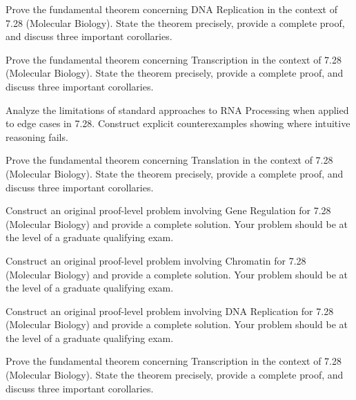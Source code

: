\documentclass[12pt,a4paper]{exam}
\begin{document}
\begin{questions}

\question[2]
Prove the fundamental theorem concerning DNA Replication in the context of 7.28 (Molecular Biology). State the theorem precisely, provide a complete proof, and discuss three important corollaries.

\vspace{0.3cm}

\question[4]
Prove the fundamental theorem concerning Transcription in the context of 7.28 (Molecular Biology). State the theorem precisely, provide a complete proof, and discuss three important corollaries.

\vspace{0.3cm}

\question[2]
Analyze the limitations of standard approaches to RNA Processing when applied to edge cases in 7.28. Construct explicit counterexamples showing where intuitive reasoning fails.

\vspace{0.3cm}

\question[8]
Prove the fundamental theorem concerning Translation in the context of 7.28 (Molecular Biology). State the theorem precisely, provide a complete proof, and discuss three important corollaries.

\vspace{0.3cm}

\question[3]
Construct an original proof-level problem involving Gene Regulation for 7.28 (Molecular Biology) and provide a complete solution. Your problem should be at the level of a graduate qualifying exam.

\vspace{0.3cm}

\question[3]
Construct an original proof-level problem involving Chromatin for 7.28 (Molecular Biology) and provide a complete solution. Your problem should be at the level of a graduate qualifying exam.

\vspace{0.3cm}

\question[3]
Construct an original proof-level problem involving DNA Replication for 7.28 (Molecular Biology) and provide a complete solution. Your problem should be at the level of a graduate qualifying exam.

\vspace{0.3cm}

\question[6]
Prove the fundamental theorem concerning Transcription in the context of 7.28 (Molecular Biology). State the theorem precisely, provide a complete proof, and discuss three important corollaries.


\end{questions}
\end{document}
